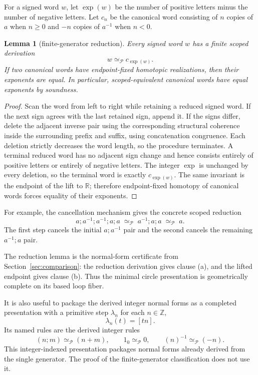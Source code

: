 \documentclass[10pt,reqno]{amsart}
\theoremstyle{definition}
\theoremstyle{plain}
\newtheorem{lemma}[definition]{Lemma}
\theoremstyle{remark}
\newcommand{\RwEq}{\mathrel{\simeq_{\!\mathcal P}}}
\newcommand{\Z}{\mathbb Z}
\begin{document}
For a signed word $w$, let $\operatorname{exp}(w)$ be the number of positive
letters minus the number of negative letters.  Let $c_n$ be the canonical
word consisting of $n$ copies of $a$ when $n\geq 0$ and $-n$ copies of
$a^{-1}$ when $n<0$.

\begin{lemma}[finite-generator reduction]
Every signed word $w$ has a finite scoped derivation
\[
  w\RwEq c_{\operatorname{exp}(w)}.
\]
If two canonical words have endpoint-fixed homotopic realizations, then their
exponents are equal.  In particular, scoped-equivalent canonical words have
equal exponents by soundness.
\end{lemma}

\begin{proof}
Scan the word from left to right while retaining a reduced signed word.  If
the next sign agrees with the last retained sign, append it.  If the signs
differ, delete the adjacent inverse pair using the corresponding structural
coherence inside the surrounding prefix and suffix, using concatenation
congruence.  Each deletion strictly decreases the word length, so the
procedure terminates.  A terminal reduced word has no adjacent sign change
and hence consists entirely of positive letters or entirely of negative
letters.  The integer $\operatorname{exp}$ is unchanged by every deletion,
so the terminal word is exactly $c_{\operatorname{exp}(w)}$.  The same
invariant is the endpoint of the lift to $\mathbb R$; therefore endpoint-fixed
homotopy of canonical words forces equality of their exponents.
\end{proof}

For example, the cancellation mechanism gives the concrete scoped reduction
\[
  a;a^{-1};a^{-1};a;a
  \;\RwEq\;a^{-1};a;a
  \;\RwEq\;a.
\]
The first step cancels the initial $a;a^{-1}$ pair and the second cancels the
remaining $a^{-1};a$ pair.

The reduction lemma is the normal-form certificate from
Section~\ref{sec:comparison}: the reduction derivation gives clause (a), and the lifted endpoint
gives clause (b).  Thus the
minimal circle presentation is geometrically complete on its based loop
fiber.

It is also useful to package the derived integer normal forms as a completed
presentation with a primitive step $\lambda_n$ for each $n\in\Z$,
\[
  \lambda_n(t)=[tn].
\]
Its named rules are the derived integer rules
\[
  (n;m)\RwEq(n+m),\qquad 1_0\RwEq 0,
  \qquad (n)^{-1}\RwEq(-n).
\]
This integer-indexed presentation packages normal forms already derived
from the single generator.  The proof of the finite-generator classification
does not use it.
\end{document}
